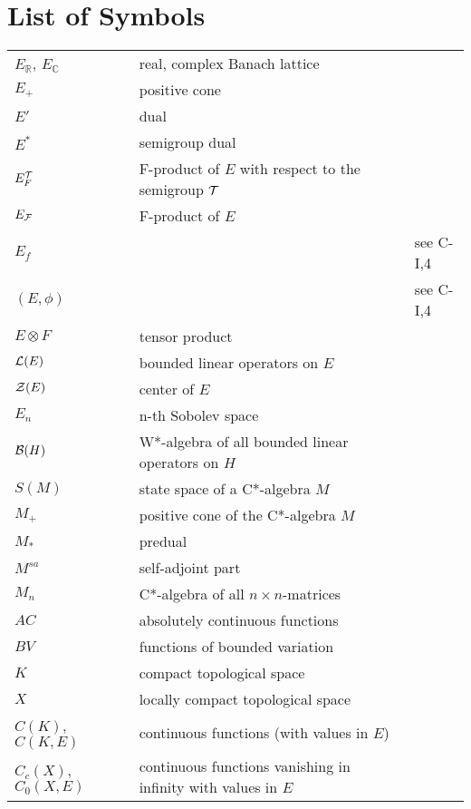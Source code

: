 
\setcounter{chapter}{0}
\renewcommand\thepart{}
\renewcommand\thechapter{}
\chapter*{List of Symbols}
\begin{longtable}{p{}p{}p{}}


$E_{\mathbb{R}}$, $E_{\mathbb{C}}$ & real, complex Banach lattice & \\
$E_{+}$ & positive cone & \\
$E'$ & dual & \\
$E^*$ & semigroup dual & \\
$E_F^{\mathcal{T}}$ & F-product of $E$ with respect to the semigroup $\mathcal{T}$ & \\
$E_{\mathcal{F}}$ & F-product of $E$ & \\
$E_f$ & & see C-I,4 \\
$(E,\phi)$ & & see C-I,4 \\
$E \otimes F$ & tensor product & \\
$\mathcal{L}(E)$ & bounded linear operators on $E$ & \\
$\mathcal{Z}(E)$ & center of $E$ & \\
$E_n$ & n-th Sobolev space & \\
$\mathcal{B}(H)$ & W*-algebra of all bounded linear operators on $H$ & \\
$S(M)$ & state space of a C*-algebra $M$ & \\
$M_+$ & positive cone of the C*-algebra $M$ & \\
$M_*$ & predual & \\
$M^{sa}$ & self-adjoint part & \\
$M_n$ & C*-algebra of all $n \times n$-matrices & \\
$AC$ & absolutely continuous functions & \\
$BV$ & functions of bounded variation & \\
$K$ & compact topological space & \\
$X$ & locally compact topological space & \\
$C(K)$, $C(K,E)$ & continuous functions (with values in $E$) & \\
$C_c(X)$, $C_0(X,E)$ & continuous functions vanishing in infinity with values in $E$ & \\

\end{longtable}
